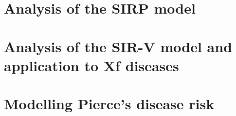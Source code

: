 \documentclass[
	10pt, %
	fleqn, %
	a4paper, %
]{LegrandOrangeBook}
\begin{document}
\begin{appendices}

	\renewcommand{\chaptername}{Appendix}



	\chapterspaceabove{6.75cm}
	\chapterspacebelow{7.25cm}

	\chapter{Analysis of the SIRP model}
	



	\chapterspaceabove{6.75cm}
	\chapterspacebelow{7.25cm}

	\chapter{Analysis of the SIR-V model and application to Xf diseases}
	


	\chapterspaceabove{6.75cm}
	\chapterspacebelow{7.25cm}

	\chapter{Modelling Pierce’s disease risk}
	


\end{appendices}

\end{document}
